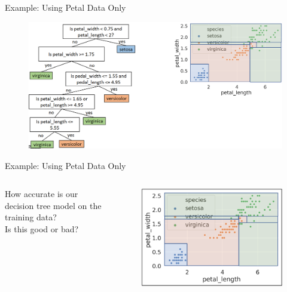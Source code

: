 \documentclass[aspectratio=169]{../latex_main/tntbeamer}  %
\begin{document}
	
	\begin{frame}{Example: Using Petal Data Only}
	    \begin{figure}
	        \includegraphics[scale=.34]{Bild15}
	    \end{figure}
	\end{frame}
	
	
	\begin{frame}{Example: Using Petal Data Only}
	   \begin{columns}
	        \begin{column}{.5\textwidth}
	               How accurate is our decision tree model on the training data?\\
	               \bigskip
	                Is this good or bad?
	        \end{column}
	   
	   
	         \begin{column}{.5\textwidth}
	               \begin{figure}
	                     \includegraphics[scale=.34]{Bild16}
	                \end{figure}
	        \end{column}
	   \end{columns}
	 \end{frame}
	 
\end{document}
